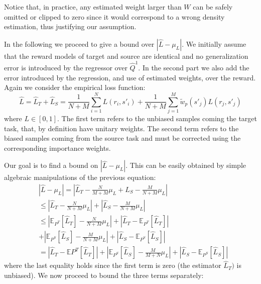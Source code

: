       \noindent Notice that, in practice, any estimated weight larger than $W$ can be safely omitted or clipped
      to zero since it would correspond to a wrong density estimation, thus justifying our assumption.\newline

      \noindent In the following we proceed to give a bound over $|\hat{L} - \mu_{L}|$. We initially
      assume that the reward models of target and source are identical and no generalization error is introduced
      by the regressor over $\hat{Q}^{1}$. In the second part we also add the error introduced by the regression,
      and use of estimated weights, over the reward.\newline
      Again we consider the empirical loss function:
      \begin{equation}
        \hat{L} = \hat{L}_{T} + \hat{L}_{S} = \frac{1}{N+M} \sum_{i=1}^{N} L(r_i, s'_i) + \frac{1}{N+M} \sum_{j=1}^{M} \tilde{w}_{p}(s'_j)L(r_j,s'_j)
      \end{equation}
      where $L \in [0,1]$. The first term refers to the unbiased samples coming the target task, that, by definition
      have unitary weights. The second term refers to the biased samples coming from the source task and must be
      corrected using the corresponding importance weights.\newline

      \noindent Our goal is to find a bound on $|\hat{L} - \mu_{L}|$. This can be easily obtained by simple
      algebraic manipulations of the previous equation:
      \begin{equation}
        \begin{aligned}
          & \left | \hat{L} - \mu_{L} \right | = \left | \hat{L}_{T} - \frac{N}{M+M} \mu_{L} + \hat{L}_{S} - \frac{M}{N+M} \mu_{L} \right | \\
          & \leq \left | \hat{L}_{T} - \frac{N}{N+M} \mu_{L} \right | + \left | \hat{L}_{S} - \frac{M}{N+M} \mu_{L} \right | \\
          & \leq \left | \mathbb{E}_{P^T}[\hat{L}_{T}] - \frac{N}{N+M} \mu_{L} \right | + \left | \hat{L}_{T} - \mathbb{E}_{P^T}[\hat{L}_{T}] \right | \\
          & + \left | \mathbb{E}_{P^S} [\hat{L}_{S}] - \frac{M}{N+M} \mu_{L} \right | + \left | \hat{L}_{S} - \mathbb{E}_{P^S} [\hat{L}_{S}] \right | \\
          & = \left | \hat{L}_{T} - \mathbb{E}{P^T}[\hat{L}_{T}] \right | + \left | \mathbb{E}_{P^S}[\hat{L}_{S}] - \frac{M}{M+N}\mu_{L} \right | + \left | \hat{L}_{S} - \mathbb{E}_{P^{S}} [\hat{L}_{S}] \right |
        \end{aligned}
      \end{equation}
      where the last equality holds since the first term is zero (the estimator $\hat{L}_{T})$ is unbiased). We now proceed to
      bound the three terms separately:

